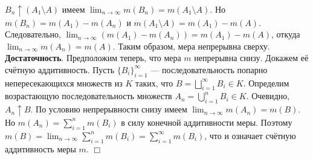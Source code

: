 \documentclass[12pt]{article}
\begin{document}
$B_n \uparrow (A_1 \setminus A)$ имеем $\lim_{n \to \infty} m(B_n) = m(A_1 \setminus A)$. Но $m(B_n) = m(A_1) - m(A_n)$ и $m(A_1 \setminus A) = m(A_1) - m(A)$. Следовательно, $\lim_{n \to \infty} (m(A_1) - m(A_n)) = m(A_1) - m(A)$, откуда $\lim_{n \to \infty} m(A_n) = m(A)$. Таким образом, мера непрерывна сверху. \textbf{Достаточность}. Предположим теперь, что мера $m$ непрерывна снизу. Докажем её счётную аддитивность. Пусть $\{B_i\}_{i=1}^\infty$ — последовательность попарно непересекающихся множеств из $K$ таких, что $B = \bigsqcup_{i=1}^\infty B_i \in K$. Определим возрастающую последовательность множеств $A_n = \bigcup_{i=1}^n B_i \in K$. Очевидно, $A_n \uparrow B$. По условию непрерывности снизу имеем $\lim_{n \to \infty} m(A_n) = m(B)$. Но $m(A_n) = \sum_{i=1}^n m(B_i)$ в силу конечной аддитивности меры. Поэтому $m(B) = \lim_{n \to \infty} \sum_{i=1}^n m(B_i) = \sum_{i=1}^\infty m(B_i)$, что и означает счётную аддитивность меры $m$. \hfill $\Box$

\end{document}

